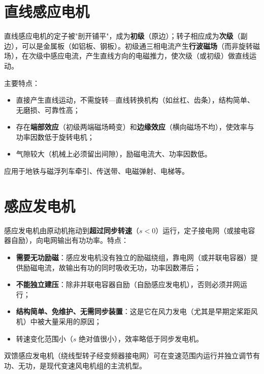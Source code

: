 \section{直线感应电机}

直线感应电机的定子被"剖开铺平"，成为\textbf{初级}（原边）；转子相应成为\textbf{次级}（副边），可以是金属板（如铝板、钢板）。初级通三相电流产生\textbf{行波磁场}（而非旋转磁场），在次级中感应电流，产生直线方向的电磁推力，使次级（或初级）做直线运动。

主要特点：
\begin{itemize}
  \item 直接产生直线运动，不需旋转—直线转换机构（如丝杠、齿条），结构简单、无磨损、可靠性高；
  \item 存在\textbf{端部效应}（初级两端磁场畸变）和\textbf{边缘效应}（横向磁场不均），使效率与功率因数低于旋转电机；
  \item 气隙较大（机械上必须留出间隙），励磁电流大、功率因数低。
\end{itemize}
应用于地铁与磁浮列车牵引、传送带、电磁弹射、电梯等。

\section{感应发电机}

感应发电机由原动机拖动到\textbf{超过同步转速}（$s<0$）运行，定子接电网（或接电容器自励），向电网输出有功功率。特点：
\begin{itemize}
  \item \textbf{需要无功励磁}：感应发电机没有独立的励磁绕组，靠电网（或并联电容器）提供励磁电流，故输出有功的同时吸收无功，功率因数滞后；
  \item \textbf{不能独立建压}：除非并联电容器自励（自励感应发电机），否则必须并网运行；
  \item \textbf{结构简单、免维护、无需同步装置}：这是它在风力发电（尤其是早期定桨距风机）中被大量采用的原因；
  \item 转速变化范围小（$s$ 绝对值很小），效率略低于同步发电机。
\end{itemize}

双馈感应发电机（绕线型转子经变频器接电网）可在变速范围内运行并独立调节有功、无功，是现代变速风电机组的主流机型。
